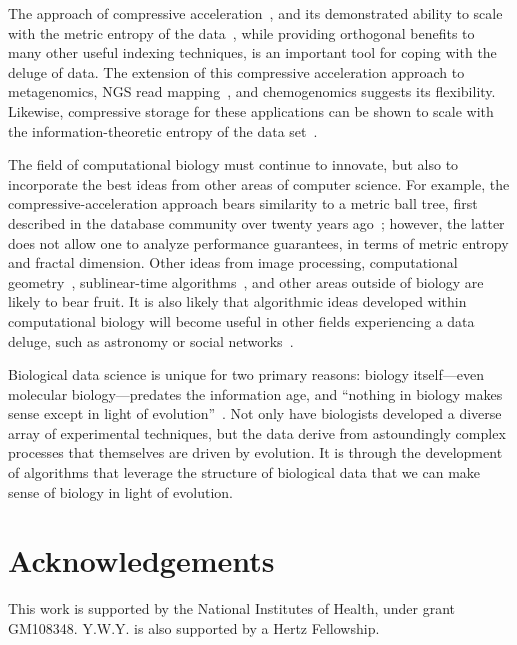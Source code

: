 \documentclass{acm_proc_article-sp}
\begin{document}
The approach of compressive acceleration~\cite{loh2012compressive}, and its 
demonstrated ability to scale with the metric entropy of the 
data~\cite{yu2015entropy}, while providing orthogonal benefits to many other
useful indexing techniques, is an important tool for coping with the deluge of
data.
The extension of this compressive acceleration approach to 
metagenomics, NGS read 
mapping~\cite{yorukoglu2015compressive}, and chemogenomics suggests its 
flexibility.
Likewise, compressive storage for these applications can be shown to scale with 
the information-theoretic entropy of the data set~\cite{yu2015entropy}.

The field of computational biology must continue to innovate, but also to 
incorporate the best ideas from other areas of computer science.
For example, the compressive-acceleration approach bears similarity to a metric 
ball tree, first described in the database community over twenty years 
ago~\cite{uhlmann1991satisfying};
however, the latter does not allow one to analyze performance guarantees, 
in terms of metric entropy and fractal dimension.
Other ideas from image processing, computational geometry~\cite{indyk1998approximate}, sublinear-time algorithms~\cite{rubinfeld2011sublinear}, and other areas 
outside of biology are likely to bear fruit. 
It is also likely that algorithmic ideas developed within computational biology
will become useful in other fields experiencing a data deluge, such as astronomy
or social networks~\cite{stephens2015big}.

Biological data science is unique for two primary reasons: biology itself---even molecular 
biology---predates the information age, and 
``nothing in biology makes sense except in light of evolution''~\cite{dobzhansky1973nothing}.
Not only have biologists developed a diverse array of experimental techniques, but the data
derive from astoundingly complex processes that themselves are driven by evolution.
It is through the development of algorithms that leverage the structure of biological data that we can
make sense of biology in light of evolution.

\section{Acknowledgements}
This work is supported by the National Institutes of Health, under
grant GM108348.
Y.W.Y. is also supported by a Hertz Fellowship.






\end{document}
